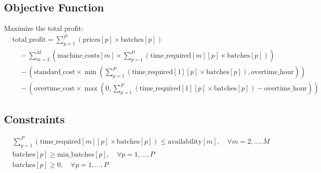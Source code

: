 \documentclass{article}
\begin{document}
\subsection*{Objective Function}
Maximize the total profit:
\begin{align*}
    &\text{total\_profit} = \sum_{p=1}^{P} \left( \text{prices}[p] \times \text{batches}[p] \right) \\
    &\quad - \sum_{m=2}^{M} \left( \text{machine\_costs}[m] \times \sum_{p=1}^{P} ( \text{time\_required}[m][p] \times \text{batches}[p] ) \right) \\
    &\quad - \left( \text{standard\_cost} \times \min\left(\sum_{p=1}^{P} (\text{time\_required}[1][p] \times \text{batches}[p]), \text{overtime\_hour} \right) \right) \\
    &\quad - \left( \text{overtime\_cost} \times \max\left(0, \sum_{p=1}^{P} (\text{time\_required}[1][p] \times \text{batches}[p]) - \text{overtime\_hour} \right) \right)
\end{align*}

\subsection*{Constraints}
\begin{align*}
    &\sum_{p=1}^{P} \left( \text{time\_required}[m][p] \times \text{batches}[p] \right) \leq \text{availability}[m], \quad \forall m=2, \ldots, M \\
    &\text{batches}[p] \geq \text{min\_batches}[p], \quad \forall p=1, \ldots, P \\
    &\text{batches}[p] \geq 0, \quad \forall p=1, \ldots, P
\end{align*}
\end{document}
